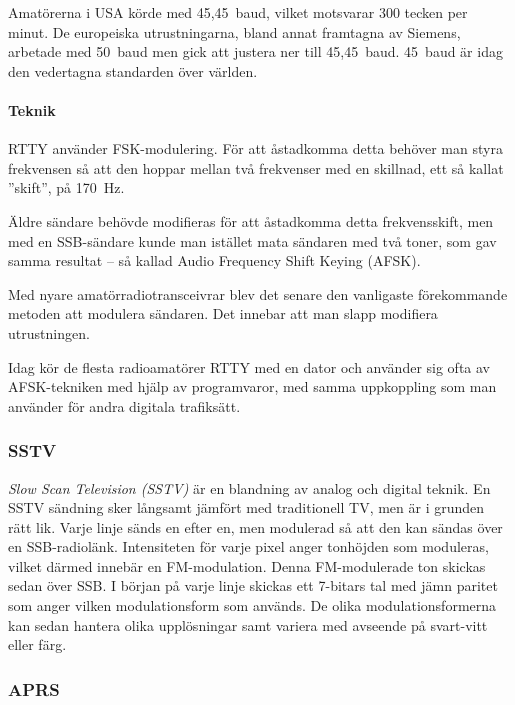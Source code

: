 Amatörerna i USA körde med 45,45~baud, vilket motsvarar 300 tecken per minut.
De europeiska utrustningarna, bland annat framtagna av Siemens, arbetade med
50~baud men gick att justera ner till 45,45~baud.
45~baud är idag den vedertagna standarden över världen.

\paragraph{Teknik}

RTTY använder FSK-modulering.
För att åstadkomma detta behöver man styra frekvensen så att den hoppar mellan
två frekvenser med en skillnad, ett så kallat ''skift'', på \qty{170}{\hertz}.

Äldre sändare behövde modifieras för att åstadkomma detta frekvensskift, men
med en SSB-sändare kunde man istället mata sändaren med två toner, som gav
samma resultat -- så kallad Audio Frequency Shift Keying (AFSK).

Med nyare amatörradiotransceivrar blev det senare den vanligaste förekommande
metoden att modulera sändaren.
Det innebar att man slapp modifiera utrustningen.

Idag kör de flesta radioamatörer RTTY med en dator och använder sig ofta av
AFSK-tekniken med hjälp av programvaror, med samma uppkoppling som man använder
för andra digitala trafiksätt.

\subsubsection{SSTV}

\emph{Slow Scan Television (SSTV)} är en blandning av analog och digital teknik.
En SSTV sändning sker långsamt jämfört med traditionell TV, men är i grunden
rätt lik.
Varje linje sänds en efter en, men modulerad så att den kan sändas över en
SSB-radiolänk.
Intensiteten för varje pixel anger tonhöjden som moduleras, vilket därmed
innebär en FM-modulation.
Denna FM-modulerade ton skickas sedan över SSB.
I början på varje linje skickas ett 7-bitars tal med jämn paritet som anger
vilken modulationsform som används.
De olika modulationsformerna kan sedan hantera olika upplösningar samt
variera med avseende på svart-vitt eller färg.

\subsubsection{APRS}
\label{modulation_aprs}

